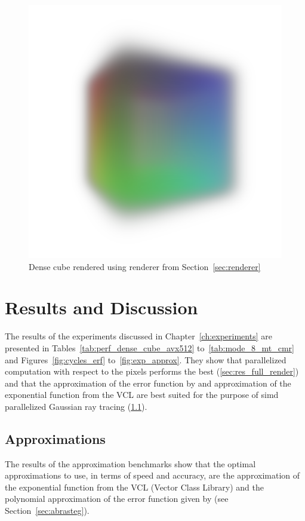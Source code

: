 \documentclass[a4paper, 11pt]{memoir}
\begin{document}
    \begin{figure}[t]
        \centering
        \includegraphics[scale=.2]{images/cube.png}
        \caption{Dense cube rendered using renderer from Section~\ref{sec:renderer}}
        \label{fig:cube_render}
    \end{figure}
    
    \chapter{Results and Discussion}
    \label{ch:results}

    The results of the experiments discussed in Chapter~\ref{ch:experiments} are presented in Tables~\ref{tab:perf_dense_cube_avx512}
    to~\ref{tab:mode_8_mt_cmr} and Figures~\ref{fig:cycles_erf} to~\ref{fig:exp_approx}. They show that parallelized
    computation with respect to the pixels performs the best (\ref{sec:res_full_render}) and that the approximation of
    the error function by \citeauthor{AbraSteg72} and approximation of the exponential function from the VCL are best
    suited for the purpose of \gls{simd} parallelized Gaussian ray tracing (\ref{sec:res_approx}).

    \section{Approximations}
    \label{sec:res_approx}
    The results of the approximation benchmarks show that the optimal approximations to use, in terms of speed and
    accuracy, are the approximation of the exponential function from the VCL (Vector Class Library) and the polynomial
    approximation of the error function given by \citeauthor{AbraSteg72} (see Section~\ref{sec:abrasteg}).
\end{document}

